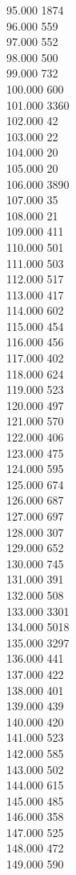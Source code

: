{ 95.000	1874 \\
 96.000	559 \\
 97.000	552 \\
 98.000	500 \\
 99.000	732 \\
 100.000	600 \\
 101.000	3360 \\
 102.000	42 \\
 103.000	22 \\
 104.000	20 \\
 105.000	20 \\
 106.000	3890 \\
 107.000	35 \\
 108.000	21 \\
 109.000	411 \\
 110.000	501 \\
 111.000	503 \\
 112.000	517 \\
 113.000	417 \\
 114.000	602 \\
 115.000	454 \\
 116.000	456 \\
 117.000	402 \\
 118.000	624 \\
 119.000	523 \\
 120.000	497 \\
 121.000	570 \\
 122.000	406 \\
 123.000	475 \\
 124.000	595 \\
 125.000	674 \\
 126.000	687 \\
 127.000	697 \\
 128.000	307 \\
 129.000	652 \\
 130.000	745 \\
 131.000	391 \\
 132.000	508 \\
 133.000	3301 \\
 134.000	5018 \\
 135.000	3297 \\
 136.000	441 \\
 137.000	422 \\
 138.000	401 \\
 139.000	439 \\
 140.000	420 \\
 141.000	523 \\
 142.000	585 \\
 143.000	502 \\
 144.000	615 \\
 145.000	485 \\
 146.000	358 \\
 147.000	525 \\
 148.000	472 \\
 149.000	590 \\
}
